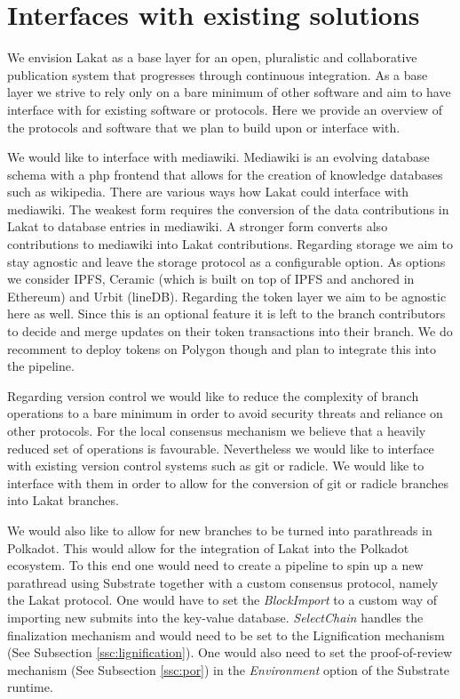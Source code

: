 
\section{Interfaces with existing solutions}

We envision Lakat as a base layer for an open, pluralistic and collaborative publication system that progresses through continuous integration. As a base layer we strive to rely only on a bare minimum of other software and aim to have interface with for existing software or protocols. Here we provide an overview of the protocols and software that we plan to build upon or interface with.

We would like to interface with mediawiki. Mediawiki is an evolving database schema with a php frontend that allows for the creation of knowledge databases such as wikipedia. There are various ways how Lakat could interface with mediawiki. The weakest form requires the conversion of the data contributions in Lakat to database entries in mediawiki. A stronger form converts also contributions to mediawiki into Lakat contributions. Regarding storage we aim to stay agnostic and leave the storage protocol as a configurable option. As options we consider IPFS, Ceramic (which is built on top of IPFS and anchored in Ethereum) and Urbit (lineDB). Regarding the token layer we aim to be agnostic here as well. Since this is an optional feature it is left to the branch contributors to decide and merge updates on their token transactions into their branch. We do recomment to deploy tokens on Polygon though and plan to integrate this into the pipeline.

Regarding version control we would like to reduce the complexity of branch operations to a bare minimum in order to avoid security threats and reliance on other protocols. For the local consensus mechanism we believe that a heavily reduced set of operations is favourable. Nevertheless we would like to interface with existing version control systems such as git or radicle. We would like to interface with them in order to allow for the conversion of git or radicle branches into Lakat branches.

We would also like to allow for new branches to be turned into parathreads in Polkadot. This would allow for the integration of Lakat into the Polkadot ecosystem. To this end one would need to create a pipeline to spin up a new parathread using Substrate together with a custom consensus protocol, namely the Lakat protocol. One would have to set the \textit{BlockImport} to a custom way of importing new submits into the key-value database. \textit{SelectChain} handles the finalization mechanism and would need to be set to the Lignification mechanism (See Subsection \ref{ssc:lignification}). One would also need to set the proof-of-review mechanism (See Subsection \ref{ssc:por}) in the \textit{Environment} option of the Substrate runtime.
